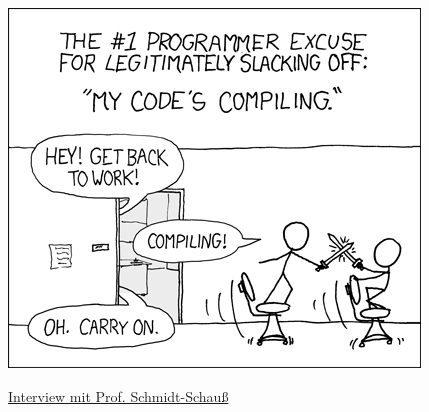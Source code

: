 \vspace{1cm}
\includegraphics[width=0.95\linewidth]{comics/compiling.png}

\begin{flushleft}\underline{Interview mit Prof. Schmidt-Schauß} \end{flushleft}

